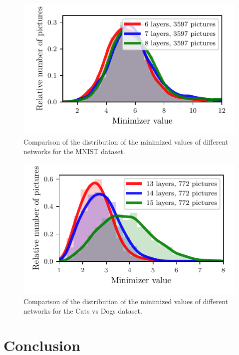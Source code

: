 \documentclass[%
 reprint,
 amsmath,amssymb,
 aps,
]{revtex4-1}
\begin{document}
\begin{figure}
\centering
\showthe\columnwidth
\includegraphics[width = 1\linewidth]{figures/plot_mnist_robustness_minimizer.pdf}
\caption{Comparison of the distribution of the minimized values of different networks for the MNIST dataset.}
\label{fig:comp_min_mnist}
\end{figure}

\begin{figure}
\centering
\showthe\columnwidth
\includegraphics[width = 1\linewidth]{figures/plot_cats_vs_dogs_robustness_minimizer.pdf}
\caption{Comparison of the distribution of the minimized values of different networks for the Cats vs Dogs dataset.}
\label{fig:comp_min_cats_vs_dogs}
\end{figure}

\section{Conclusion}
\end{document}
